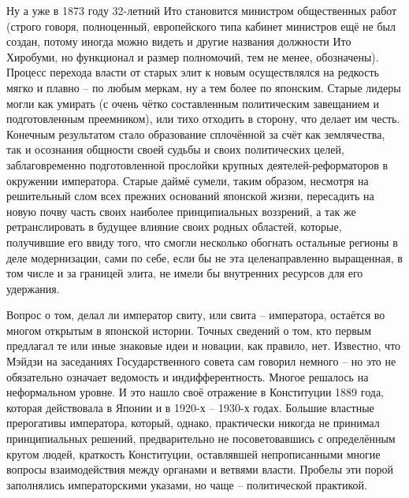 Ну а уже в 1873 году 32-летний Ито становится министром общественных работ (строго говоря, полноценный, европейского типа кабинет министров ещё не был создан, потому иногда можно видеть и другие названия должности Ито Хиробуми, но функционал и размер полномочий, тем не менее, обозначены). Процесс перехода власти от старых элит к новым осуществлялся на редкость мягко и плавно – по любым меркам, ну а тем более по японским. Старые лидеры могли как умирать (с очень чётко составленным политическим завещанием и подготовленным преемником), или тихо отходить в сторону, что делает им честь. Конечным результатом стало образование сплочённой за счёт как землячества, так и осознания общности своей судьбы и своих политических целей, заблаговременно подготовленной прослойки крупных деятелей-реформаторов в окружении императора. Старые даймё сумели, таким образом, несмотря на решительный слом всех прежних оснований японской жизни, пересадить на новую почву часть своих наиболее принципиальных воззрений, а так же ретранслировать в будущее влияние своих родных областей, которые, получившие его ввиду того, что смогли несколько обогнать остальные регионы в деле модернизации, сами по себе, если бы не эта целенаправленно выращенная, в том числе и за границей элита, не имели бы внутренних ресурсов для его удержания.

Вопрос о том, делал ли император свиту, или свита – императора, остаётся во многом открытым в японской истории. Точных сведений о том, кто первым предлагал те или иные знаковые идеи и новации, как правило, нет. Известно, что Мэйдзи на заседаниях Государственного совета сам говорил немного – но это не обязательно означает ведомость и индифферентность. Многое решалось на неформальном уровне. И это нашло своё отражение в Конституции 1889 года, которая действовала в Японии и в 1920-х – 1930-х годах. Большие властные прерогативы императора, который, однако, практически никогда не принимал принципиальных решений, предварительно не посоветовавшись с определённым кругом людей, краткость Конституции, оставлявшей непрописанными многие вопросы взаимодействия между органами и ветвями власти. Пробелы эти порой заполнялись императорскими указами, но чаще – политической практикой. 

